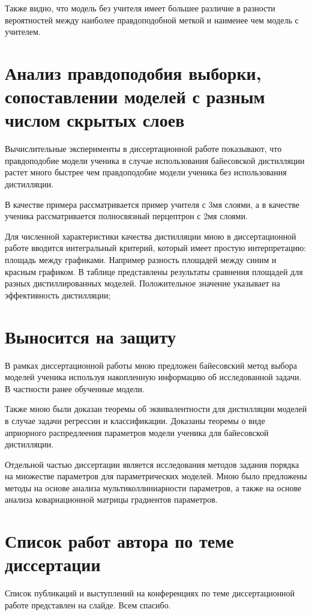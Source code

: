 \documentclass[10pt, twoside]{article}
\begin{document}
Также видно, что модель без учителя имеет большее различие в разности вероятностей между наиболее правдоподобной меткой и наименее чем модель с учителем.

\section{Анализ правдоподобия выборки, сопоставлении моделей с разным числом скрытых слоев}

Вычислительные эксперименты в диссертационной работе показывают, что правдоподобие модели ученика в случае использования байесовской дистилляции растет много быстрее чем правдоподобие модели ученика без использования дистилляции.

В качестве примера рассматривается пример учителя с 3мя слоями, а в качестве ученика рассматривается полносвязный перцептрон с 2мя слоями.

Для численной характеристики качества дистилляции мною в диссертационной работе вводится интегральный критерий, который имеет простую интерпретацию: площадь между графиками. Например разность площадей между синим и красным графиком. В таблице представлены результаты сравнения площадей для разных дистиллированных моделей. Положительное значение указывает на эффективность дистилляции;

\section{Выносится на защиту}
В рамках диссертационной работы мною предложен байесовский метод выбора моделей ученика используя накопленную информацию об исследованной задачи. В частности ранее обученные модели.

Также мною были доказан теоремы об эквивалентности для дистилляции моделей в случае задачи регрессии и классификации. Доказаны теоремы о виде априорного распредлеения параметров модели ученика для байесовской дистилляции.

Отдельной частью диссертации является исследования методов задания порядка на множестве параметров для параметрических моделей. Мною было предложены методы на основе анализа мультиколлиниарности параметров, а также на основе анализа ковариационной матрицы градиентов параметров.

\section{Список работ автора по теме диссертации}
Список публикаций и выступлений на конференциях по теме диссертационной работе представлен на слайде. Всем спасибо.
\end{document}
